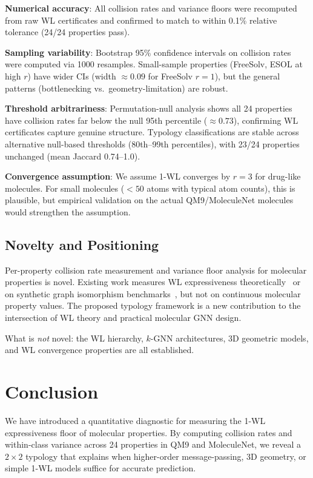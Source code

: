 \documentclass[11pt,letterpaper]{article}
\begin{document}
\textbf{Numerical accuracy}: All collision rates and variance floors were recomputed from raw WL certificates and confirmed to match to within 0.1\% relative tolerance (24/24 properties pass).

\textbf{Sampling variability}: Bootstrap 95\% confidence intervals on collision rates were computed via 1000 resamples. Small-sample properties (FreeSolv, ESOL at high $r$) have wider CIs (width $\approx 0.09$ for FreeSolv $r=1$), but the general patterns (bottlenecking vs.\ geometry-limitation) are robust.

\textbf{Threshold arbitrariness}: Permutation-null analysis shows all 24 properties have collision rates far below the null 95th percentile ($\approx 0.73$), confirming WL certificates capture genuine structure. Typology classifications are stable across alternative null-based thresholds (80th--99th percentiles), with 23/24 properties unchanged (mean Jaccard 0.74--1.0).

\textbf{Convergence assumption}: We assume 1-WL converges by $r=3$ for drug-like molecules. For small molecules ($<50$ atoms with typical atom counts), this is plausible, but empirical validation on the actual QM9/MoleculeNet molecules would strengthen the assumption.

\subsection{Novelty and Positioning}

Per-property collision rate measurement and variance floor analysis for molecular properties is novel. Existing work measures WL expressiveness theoretically~\citep{Xu2019,Maron2019} or on synthetic graph isomorphism benchmarks~\citep{Wang2023}, but not on continuous molecular property values. The proposed typology framework is a new contribution to the intersection of WL theory and practical molecular GNN design.

What is \emph{not} novel: the WL hierarchy, $k$-GNN architectures, 3D geometric models, and WL convergence properties are all established.

\section{Conclusion}

We have introduced a quantitative diagnostic for measuring the 1-WL expressiveness floor of molecular properties. By computing collision rates and within-class variance across 24 properties in QM9 and MoleculeNet, we reveal a $2\times2$ typology that explains when higher-order message-passing, 3D geometry, or simple 1-WL models suffice for accurate prediction.
\end{document}
